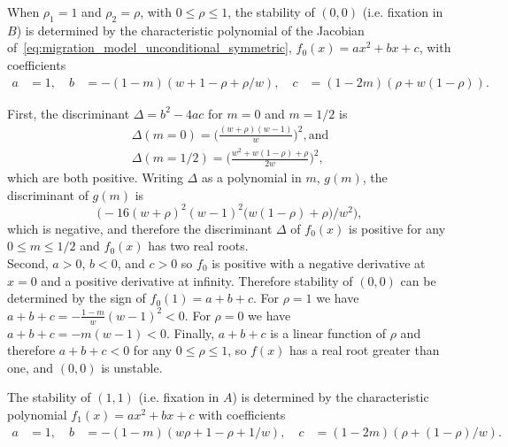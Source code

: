 \documentclass[14pt]{extarticle}
\begin{document}
When $\rho_1=1$ and $\rho_2=\rho$, with $0 \le \rho \le 1$, the stability of $(0,0)$ (i.e. fixation in $B$) is determined by the characteristic polynomial of the Jacobian of~\eqref{eq:migration_model_unconditional_symmetric}, $f_0(x)=ax^2+bx+c$, with coefficients
\begin{equation}
\begin{aligned}
a &= 1, \quad
b &= -(1 - m) (w + 1 - \rho + \rho/w), \quad
c &=  (1 - 2m)(\rho + w(1-\rho)).
\end{aligned}
\end{equation}

First, the discriminant $\Delta = b^2-4ac$ for $m=0$ and $m=1/2$ is
\begin{equation}\begin{aligned}
\Delta(m=0) = \Big(\frac{(w + \rho) (w-1)}{w}\Big)^2, \text{and} \\
\Delta(m=1/2) = \Big(\frac{w^2 + w(1-\rho) + \rho}{2 w}\Big)^2,
\end{aligned}\end{equation}
which are both positive.
Writing $\Delta$ as a polynomial in $m$, $g(m)$, the discriminant of $g(m)$ is 
$$
\big(- 16 (w + \rho)^2 (w - 1)^2 \big(w (1 - \rho) + \rho \big) / w^2\big),
$$
which is negative, and therefore the discriminant $\Delta$ of $f_0(x)$ is positive for any $0 \le m \le 1/2$ and $f_0(x)$ has two real roots. \\
Second, $a>0$, $b<0$, and $c>0$ so $f_0$ is positive with a negative derivative at $x=0$ and  a positive derivative at infinity.
Therefore stability of $(0,0)$ can be determined by the sign of $f_0(1)=a+b+c$.
For $\rho=1$ we have $a+b+c=-\frac{1-m}{w}(w-1)^2<0$.
For $\rho=0$ we have $a+b+c=-m(w-1)<0$.
Finally, $a+b+c$ is a linear function of $\rho$ and therefore $a+b+c<0$ for any $0 \le \rho \le 1$, so $f(x)$ has a real root greater than one, and $(0,0)$ is unstable.

The stability of $(1,1)$ (i.e. fixation in $A$) is determined by the characteristic polynomial $f_1(x)=ax^2+bx+c$ with coefficients
\begin{equation}
\begin{aligned}
a &= 1, \quad
b &= -(1 - m) (w\rho + 1 - \rho + 1/w), \quad
c &=  (1 - 2m)(\rho + (1-\rho)/w).
\end{aligned}
\end{equation}
\end{document}
